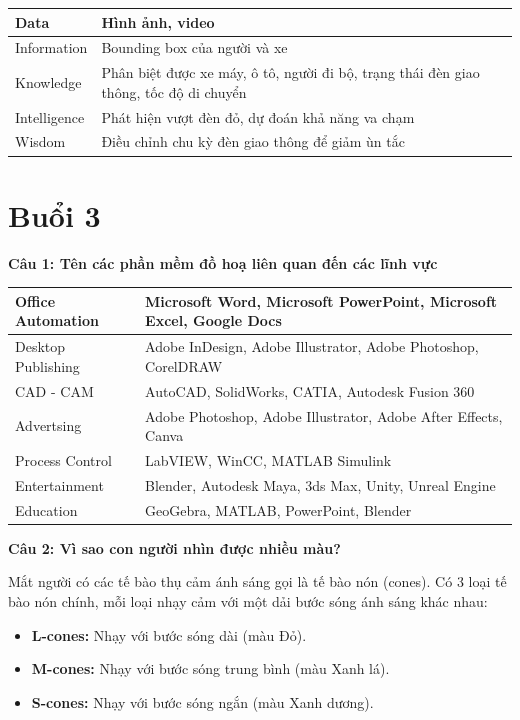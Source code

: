 \begin{table}[H]
	\centering
	\begin{tabular}{|l|p{12cm}|}
		\hline
		Data & Hình ảnh, video \\ \hline
		Information & Bounding box của người và xe \\ \hline
		Knowledge & Phân biệt được xe máy, ô tô, người đi bộ, trạng thái đèn giao thông, tốc độ di chuyển \\ \hline
		Intelligence & Phát hiện vượt đèn đỏ, dự đoán khả năng va chạm \\ \hline
		Wisdom & Điều chỉnh chu kỳ đèn giao thông để giảm ùn tắc \\ \hline
	\end{tabular}
\end{table}

\section{Buổi 3}

\textbf{Câu 1: Tên các phần mềm đồ hoạ liên quan đến các lĩnh vực}

\begin{table}[H]
	\centering
	\begin{tabular}{|l|p{12cm}|}
		\hline
		Office Automation & Microsoft Word, Microsoft PowerPoint, Microsoft Excel, Google Docs \\ \hline
		Desktop Publishing & Adobe InDesign, Adobe Illustrator, Adobe Photoshop, CorelDRAW \\ \hline
		CAD - CAM & AutoCAD, SolidWorks, CATIA, Autodesk Fusion 360 \\ \hline
		Advertsing & Adobe Photoshop, Adobe Illustrator, Adobe After Effects, Canva \\ \hline
		Process Control & LabVIEW, WinCC, MATLAB Simulink \\ \hline
		Entertainment & Blender, Autodesk Maya, 3ds Max, Unity, Unreal Engine \\ \hline
		Education & GeoGebra, MATLAB, PowerPoint, Blender \\ \hline
	\end{tabular}
\end{table}

\textbf{Câu 2: Vì sao con người nhìn được nhiều màu?}

Mắt người có các tế bào thụ cảm ánh sáng gọi là tế bào nón (cones). Có 3 loại tế bào nón chính, mỗi loại nhạy cảm với một dải bước sóng ánh sáng khác nhau:

\begin{itemize}
	\item \textbf{L-cones:} Nhạy với bước sóng dài (màu Đỏ).
	
	\item \textbf{M-cones:} Nhạy với bước sóng trung bình (màu Xanh lá).
	
	\item \textbf{S-cones:} Nhạy với bước sóng ngắn (màu Xanh dương).
\end{itemize}


